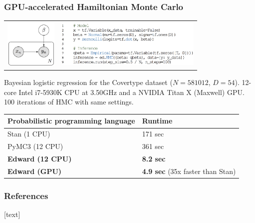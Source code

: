 \documentclass[10pt]{beamer}
\begin{document}
\begin{frame}
\frametitle{GPU-accelerated Hamiltonian Monte Carlo}
\begin{tabular}{cc}
\hspace{-1em}
\includegraphics[width=2.5cm]{img/logistic_graph.png}
&
\includegraphics[width=7cm]{img/logistic_code.png}
\end{tabular}

Bayesian logistic regression for the Covertype dataset ($N=581012$, $D=54$).
12-core Intel i7-5930K CPU at 3.50GHz and a NVIDIA Titan X (Maxwell) GPU.  100
iterations of HMC with same settings.

\begin{table}[tb]
\centering
\begin{tabular}{ll}
\toprule
Probabilistic programming language & Runtime
\\
\midrule
Stan (1 CPU) & 171 sec \\
PyMC3 (12 CPU) & 361 sec \\
\textbf{Edward (12 CPU)} & \textbf{8.2 sec} \\
\textbf{Edward (GPU)} & \textbf{4.9 sec} (35x faster than Stan)\\
\bottomrule
\end{tabular}
\end{table}
\citep{carpenter_stan_2017, salvatier_probabilistic_2015}
\end{frame}


\begin{frame}[allowframebreaks]%
  \frametitle{References}
  [text]
  \renewcommand*{\bibfont}{\small}
  \printbibliography
\end{frame}
\end{document}
